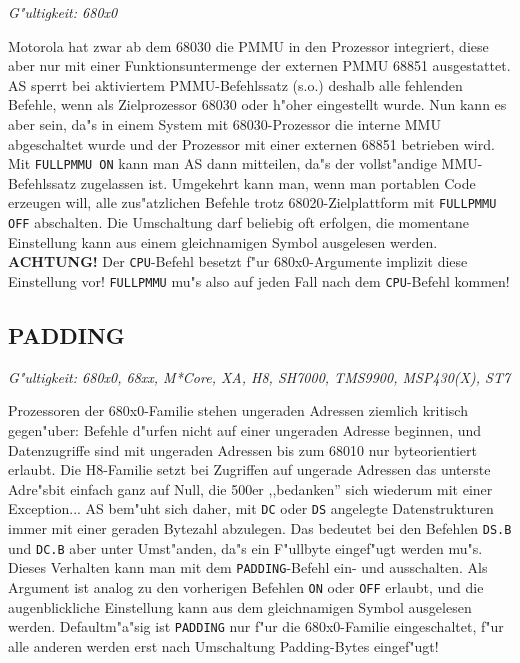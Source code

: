\documentclass[12pt,a4paper,twoside]{report}
\makeatletter
\newcommand{\bb}[1]{{\bf #1}}
\newcommand{\tty}[1]{{\tt #1}}
\newcommand{\ttindex}[1]{\index{#1@{\tt #1}}}
\makeatother
\begin{document}
{\em G"ultigkeit: 680x0}

Motorola hat zwar ab dem 68030 die PMMU in den Prozessor integriert,
diese aber nur mit einer Funktionsuntermenge der externen PMMU 68851
ausgestattet.  AS sperrt bei aktiviertem PMMU-Befehlssatz (s.o.) deshalb
alle fehlenden Befehle, wenn als Zielprozessor 68030 oder h"oher
eingestellt wurde.  Nun kann es aber sein, da"s in einem System mit
68030-Prozessor die interne MMU abgeschaltet wurde und der Prozessor
mit einer externen 68851 betrieben wird.  Mit \tty{FULLPMMU ON} kann man
AS dann mitteilen, da"s der vollst"andige MMU-Befehlssatz zugelassen
ist.  Umgekehrt kann man, wenn man portablen Code erzeugen will, alle
zus"atzlichen Befehle trotz 68020-Zielplattform mit \tty{FULLPMMU OFF}
abschalten.  Die Umschaltung darf beliebig oft erfolgen, die momentane
Einstellung kann aus einem gleichnamigen Symbol ausgelesen werden.
\bb{ACHTUNG!}  Der \tty{CPU}-Befehl besetzt f"ur 680x0-Argumente implizit
diese Einstellung vor!  \tty{FULLPMMU} mu"s also auf jeden Fall nach dem
\tty{CPU}-Befehl kommen!


\subsection{PADDING}
\ttindex{PADDING}

{\em G"ultigkeit: 680x0, 68xx, M*Core, XA, H8, SH7000, TMS9900, MSP430(X), ST7}

Prozessoren der 680x0-Familie stehen ungeraden Adressen ziemlich
kritisch gegen"uber: Befehle d"urfen nicht auf einer ungeraden Adresse
beginnen, und Datenzugriffe sind mit ungeraden Adressen bis zum
68010 nur byteorientiert erlaubt.  Die H8-Familie setzt bei Zugriffen
auf ungerade Adressen das unterste Adre"sbit einfach ganz auf Null,
die 500er ,,bedanken'' sich wiederum mit einer Exception...
AS bem"uht sich daher, mit \tty{DC} oder \tty{DS} angelegte Datenstrukturen
immer mit einer geraden Bytezahl abzulegen.  Das bedeutet bei den Befehlen
\tty{DS.B} und \tty{DC.B} aber unter Umst"anden, da"s ein F"ullbyte
eingef"ugt werden mu"s.  Dieses Verhalten kann man mit dem
\tty{PADDING}-Befehl ein- und ausschalten.  Als Argument
ist analog zu den vorherigen Befehlen \tty{ON} oder \tty{OFF} erlaubt, und
die augenblickliche Einstellung kann aus dem gleichnamigen Symbol
ausgelesen werden. Defaultm"a"sig ist \tty{PADDING} nur f"ur die
680x0-Familie eingeschaltet, f"ur alle anderen werden erst nach Umschaltung
Padding-Bytes eingef"ugt!
\end{document}
